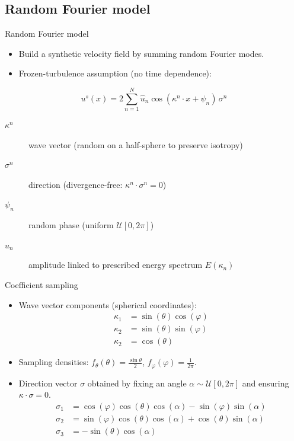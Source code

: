 \documentclass[11pt]{beamer}
\begin{document}
\subsection{Random Fourier model}
\begin{frame}{Random Fourier model}
  \begin{itemize}
    \item Build a synthetic velocity field by summing random Fourier modes.
    \item Frozen-turbulence assumption (no time dependence):
  \end{itemize}
  \begin{equation}
    u^s(x)= 2\sum_{n=1}^{N} \hat{u}_n \cos(\kappa^n\cdot x + \psi_n)\,\sigma^n
  \end{equation}
  \begin{description}
    \item[$\kappa^n$] wave vector (random on a half-sphere to preserve isotropy)
    \item[$\sigma^n$] direction (divergence-free: $\kappa^n\cdot\sigma^n=0$)
    \item[$\psi_n$] random phase (uniform $\mathcal{U}[0,2\pi]$)
    \item[$\hat{u}_n$] amplitude linked to prescribed energy spectrum $E(\kappa_n)$
  \end{description}
\end{frame}

\begin{frame}{Coefficient sampling}
  \begin{itemize}
    \item Wave vector components (spherical coordinates):
        \begin{align}
            \kappa_1 &= \sin(\theta)\cos(\varphi) \\
            \kappa_2 &= \sin(\theta)\sin(\varphi) \\
            \kappa_2 & = \cos(\theta)
        \end{align}
    \item Sampling densities: $f_\theta(\theta)=\frac{\sin\theta}{2}$, $f_\varphi(\varphi)=\frac{1}{2\pi}$.
    \item Direction vector $\sigma$ obtained by fixing an angle $\alpha\sim\mathcal{U}[0,2\pi]$ and ensuring $\kappa\cdot\sigma=0$.
        \begin{align}
            \sigma_1&=\cos(\varphi)\cos(\theta)\cos(\alpha)-\sin(\varphi)\sin(\alpha) \\
            \sigma_2&=\sin(\varphi)\cos(\theta)\cos(\alpha)+\cos(\theta)\sin(\alpha) \\
            \sigma_3&=-\sin(\theta)\cos(\alpha)
        \end{align}
  \end{itemize}
\end{frame}
\end{document}
